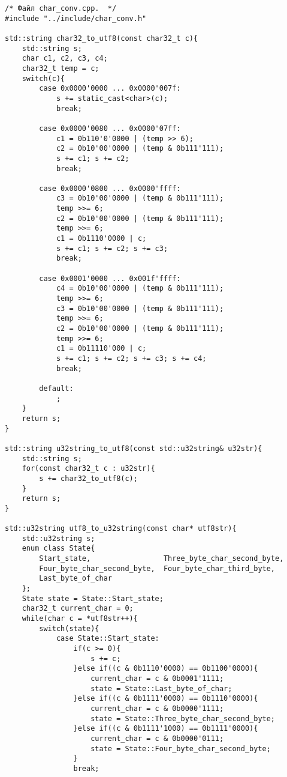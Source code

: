 \documentclass[10pt]{report}
\begin{document}
\begin{verbatim}
/* Файл char_conv.cpp.  */
#include "../include/char_conv.h"

std::string char32_to_utf8(const char32_t c){
    std::string s;
    char c1, c2, c3, c4;
    char32_t temp = c;
    switch(c){
        case 0x0000'0000 ... 0x0000'007f:
            s += static_cast<char>(c);
            break;

        case 0x0000'0080 ... 0x0000'07ff:
            c1 = 0b110'0'0000 | (temp >> 6);
            c2 = 0b10'00'0000 | (temp & 0b111'111);
            s += c1; s += c2;
            break;

        case 0x0000'0800 ... 0x0000'ffff:
            c3 = 0b10'00'0000 | (temp & 0b111'111);
            temp >>= 6;
            c2 = 0b10'00'0000 | (temp & 0b111'111);
            temp >>= 6;
            c1 = 0b1110'0000 | c;
            s += c1; s += c2; s += c3;
            break;

        case 0x0001'0000 ... 0x001f'ffff:
            c4 = 0b10'00'0000 | (temp & 0b111'111);
            temp >>= 6;
            c3 = 0b10'00'0000 | (temp & 0b111'111);
            temp >>= 6;
            c2 = 0b10'00'0000 | (temp & 0b111'111);
            temp >>= 6;
            c1 = 0b11110'000 | c;
            s += c1; s += c2; s += c3; s += c4;
            break;

        default:
            ;
    }
    return s;
}

std::string u32string_to_utf8(const std::u32string& u32str){
    std::string s;
    for(const char32_t c : u32str){
        s += char32_to_utf8(c);
    }
    return s;
}

std::u32string utf8_to_u32string(const char* utf8str){
    std::u32string s;
    enum class State{
        Start_state,                 Three_byte_char_second_byte,
        Four_byte_char_second_byte,  Four_byte_char_third_byte,
        Last_byte_of_char
    };
    State state = State::Start_state;
    char32_t current_char = 0;
    while(char c = *utf8str++){
        switch(state){
            case State::Start_state:
                if(c >= 0){
                    s += c;
                }else if((c & 0b1110'0000) == 0b1100'0000){
                    current_char = c & 0b0001'1111;
                    state = State::Last_byte_of_char;
                }else if((c & 0b1111'0000) == 0b1110'0000){
                    current_char = c & 0b0000'1111;
                    state = State::Three_byte_char_second_byte;
                }else if((c & 0b1111'1000) == 0b1111'0000){
                    current_char = c & 0b0000'0111;
                    state = State::Four_byte_char_second_byte;
                }
                break;


\end{verbatim}
\end{document}
